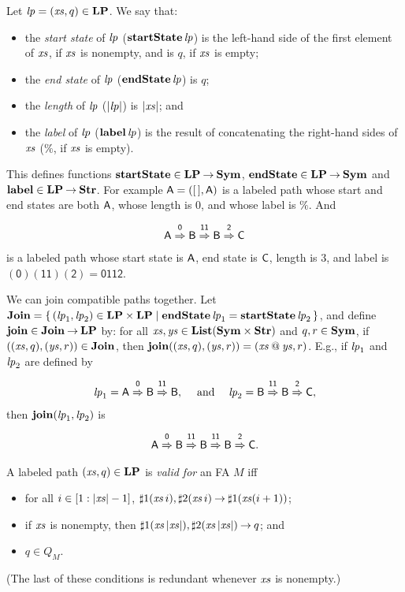 Let ${\it lp}=({\it xs},q)\in\mathbf{LP}$.
We say that:
\begin{itemize}
\item the \emph{start state} of ${\it lp}$ ($\mathbf{startState}\,{\it lp}$) is
  the left-hand side of the first element of ${\it xs}$, if ${\it xs}$ is nonempty,
  and is $q$, if ${\it xs}$ is empty;

\item the \emph{end state} of ${\it lp}$ ($\mathbf{endState}\,{\it lp}$) is $q$;

\item the \emph{length} of ${\it lp}$ ($|{\it lp}|$) is $|{\it xs}|$; and

\item the \emph{label} of ${\it lp}$ ($\mathbf{label}\,{\it lp}$) is the result of
  concatenating the right-hand sides of ${\it xs}$ ($\%$, if ${\it xs}$ is
  empty).
\end{itemize}
%
%
%
%

This defines functions $\mathbf{startState}\in\mathbf{LP}\mathbin{\to}\mathbf{Sym}$,
$\mathbf{endState}\in\mathbf{LP}\mathbin{\to}\mathbf{Sym}$ and $\mathbf{label}\in\mathbf{LP}\mathbin{\to}\mathbf{Str}$.
For example $\mathsf{A} = ([\,],\mathsf{A})$
is a labeled path whose start and end states are both $\mathsf{A}$, whose
length is $0$, and whose label is $\%$.  And
\begin{gather*}
\mathsf{A}\stackrel{\strut\mathsf{0}}{\Rightarrow}\mathsf{B}\stackrel{\strut\mathsf{11}}{\Rightarrow}\mathsf{B}\stackrel{\strut\mathsf{2}}{\Rightarrow}\mathsf{C}
\end{gather*}
is a labeled path whose start state is $\mathsf{A}$, end state is $\mathsf{C}$,
length is $3$, and label is $\mathsf{(0)(11)(2)}=\mathsf{0112}$.

We can join compatible paths together.  Let $\mathbf{Join}=
\{ \, ({\it lp}_1,{\it lp}_2)\in\mathbf{LP}\times\mathbf{LP} \mid \mathbf{endState}\,{\it lp}_1 = \mathbf{startState}\,{\it lp}_2 \, \}$,
and define $\mathbf{join}\in\mathbf{Join}\mathbin{\to}\mathbf{LP}$ by: for all ${\it xs},{\it ys}\in\mathbf{List}(\mathbf{Sym}\times\mathbf{Str})$
and $q,r\in\mathbf{Sym}$, if $(({\it xs},q),({\it ys},r))\in\mathbf{Join}$, then
$\mathbf{join}(({\it xs},q), ({\it ys},r)) = ({\it xs}\mathbin{@}{\it ys}, r)$.  E.g., if
${\it lp}_1$ and ${\it lp}_2$ are defined by
\begin{gather*}
{\it lp}_1 = 
\mathsf{A}\stackrel{\strut\mathsf{0}}{\Rightarrow}\mathsf{B}\stackrel{\strut\mathsf{11}}{\Rightarrow}\mathsf{B} , \quad\;\allowbreak\mbox{and}\allowbreak\;\quad
{\it lp}_2 =
\mathsf{B}\stackrel{\strut\mathsf{11}}{\Rightarrow}\mathsf{B}\stackrel{\strut\mathsf{2}}{\Rightarrow}\mathsf{C} ,
\end{gather*}
then $\mathbf{join}({\it lp}_1,{\it lp}_2)$ is
\begin{gather*}
\mathsf{A}\stackrel{\strut\mathsf{0}}{\Rightarrow}\mathsf{B}\stackrel{\strut\mathsf{11}}{\Rightarrow}\mathsf{B}
\stackrel{\strut\mathsf{11}}{\Rightarrow}\mathsf{B}\stackrel{\strut\mathsf{2}}{\Rightarrow}\mathsf{C} .
\end{gather*}

A labeled path $({\it xs},q)\in\mathbf{LP}$ is \emph{valid for} an FA $M$ iff
\begin{itemize}
\item for all $i\in[1:|{\it xs}|-1]$, ${{\sharp}1}({\it xs}\,i),{{\sharp}2}({\it xs}\,i)\mathbin{\to}
  {{\sharp}1}({\it xs}(i+1))$;

\item if ${\it xs}$ is nonempty, then ${{\sharp}1}({\it xs}\,|{\it xs}|),{{\sharp}2}({\it xs}\,|{\it xs}|)\mathbin{\to}
  q$; and

\item $q\in Q_M$.
\end{itemize}
(The last of these conditions is redundant whenever ${\it xs}$ is nonempty.)

